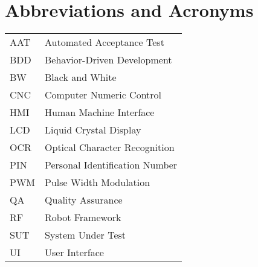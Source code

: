 
\chapter*{Abbreviations and Acronyms}


\noindent
\begin{longtable}{@{}p{}p{}@{}}

AAT & Automated Acceptance Test \\
BDD & Behavior-Driven Development \\
BW & Black and White \\
CNC & Computer Numeric Control \\
HMI & Human Machine Interface \\
LCD & Liquid Crystal Display \\
OCR & Optical Character Recognition \\
PIN & Personal Identification Number \\
PWM & Pulse Width Modulation \\
QA & Quality Assurance \\
RF & Robot Framework \\
SUT & System Under Test \\
UI & User Interface \\

\end{longtable}
